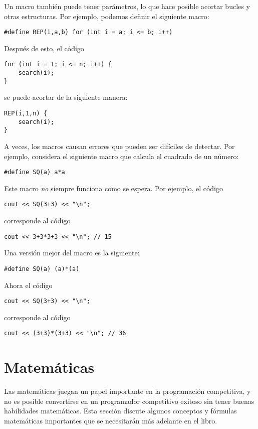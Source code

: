 Un macro tambi\'en puede tener par\'ametros,
lo que hace posible acortar bucles y otras
estructuras.
Por ejemplo, podemos definir el siguiente macro:
\begin{lstlisting}
#define REP(i,a,b) for (int i = a; i <= b; i++)
\end{lstlisting}
Despu\'es de esto, el c\'odigo
\begin{lstlisting}
for (int i = 1; i <= n; i++) {
    search(i);
}
\end{lstlisting}
se puede acortar de la siguiente manera:
\begin{lstlisting}
REP(i,1,n) {
    search(i);
}
\end{lstlisting}

A veces, los macros causan errores que pueden ser dif\'iciles
de detectar. Por ejemplo, considera el siguiente macro
que calcula el cuadrado de un n\'umero:
\begin{lstlisting}
#define SQ(a) a*a
\end{lstlisting}
Este macro \emph{no} siempre funciona como se espera.
Por ejemplo, el c\'odigo
\begin{lstlisting}
cout << SQ(3+3) << "\n";
\end{lstlisting}
corresponde al c\'odigo
\begin{lstlisting}
cout << 3+3*3+3 << "\n"; // 15
\end{lstlisting}

Una versi\'on mejor del macro es la siguiente:
\begin{lstlisting}
#define SQ(a) (a)*(a)
\end{lstlisting}
Ahora el c\'odigo
\begin{lstlisting}
cout << SQ(3+3) << "\n";
\end{lstlisting}
corresponde al c\'odigo
\begin{lstlisting}
cout << (3+3)*(3+3) << "\n"; // 36
\end{lstlisting}


\section{Matem\'aticas}

Las matem\'aticas juegan un papel importante en la programaci\'on competitiva,
y no es posible convertirse en un programador competitivo exitoso sin
tener buenas habilidades matem\'aticas.
Esta secci\'on discute algunos conceptos y f\'ormulas matem\'aticas importantes
que se necesitar\'an m\'as adelante en el libro.

